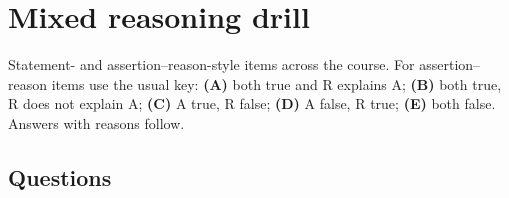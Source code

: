 \section{Mixed reasoning drill}
Statement- and assertion--reason-style items across the course. For assertion--reason items use the usual key:
\textbf{(A)} both true and R explains A; \textbf{(B)} both true, R does not explain A; \textbf{(C)} A true, R false;
\textbf{(D)} A false, R true; \textbf{(E)} both false. Answers with reasons follow.

\subsection*{Questions}
